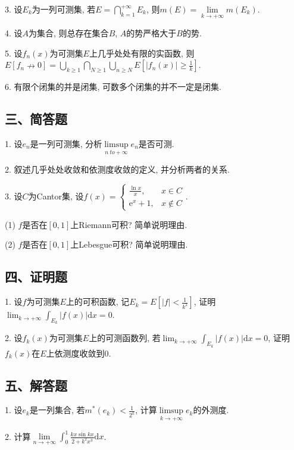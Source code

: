 \documentclass[UTF8]{article}
\begin{document}
  3. 设$E_k$为一列可测集, 若$E=\bigcap_{k=1}^{+\infty}E_k$, 则$m(E)=\lim \limits_{k \to +\infty}m(E_k)$.\par

  4. 设$A$为集合, 则总存在集合$B$, $A$的势严格大于$B$的势.\par

  5. 设$f_n(x)$为可测集$E$上几乎处处有限的实函数, 则$E\left[f_n\nrightarrow 0\right]=\bigcup_{k\geqslant 1} \bigcap_{N\geqslant 1}\bigcup_{n\geqslant N} E\left[|f_n(x)|\geqslant \frac{1}{k}\right]$.\par

  6. 有限个闭集的并是闭集, 可数多个闭集的并不一定是闭集.\par

  \subsection*{三、简答题}

  1. 设$e_n$是一列可测集, 分析$\limsup \limits_{n \ to +\infty}e_n$是否可测.\par

  2. 叙述几乎处处收敛和依测度收敛的定义, 并分析两者的关系.\par

  3. 设$C$为Cantor集, 设$f(x)=\begin{cases}
    \frac{\ln x}{x}, & x\in C \\
    \mathrm{e}^x+1, & x\notin C
  \end{cases}$.\par
  (1) $f$是否在$[0,1]$上Riemann可积? 简单说明理由.\par
  (2) $f$是否在$[0,1]$上Lebesgue可积? 简单说明理由.\par

  \subsection*{四、证明题}

  1. 设$f$为可测集$E$上的可积函数, 记$E_k=E\left[|f|<\frac{1}{k^2}\right]$, 证明$\lim_{k \to +\infty}\int_{E_k}|f(x)|\mathrm{d}x=0$.\par

  2. 设$f_k(x)$为可测集$E$上的可测函数列, 若$\lim_{k \to +\infty}\int_{E_k}|f(x)|\mathrm{d}x=0$, 证明$f_k(x)$在$E$上依测度收敛到0.\par

  \subsection*{五、解答题}

  1. 设$e_k$是一列集合, 若$m^{*}(e_k)<\frac{1}{2^k}$, 计算$\limsup \limits_{k \to +\infty}e_k$的外测度.\par

  2. 计算$\lim \limits_{n \to +\infty}\int_{0}^{1}\frac{kx \sin{kx}}{2+k^2x^3}\mathrm{d}x$.\par
\end{document}
